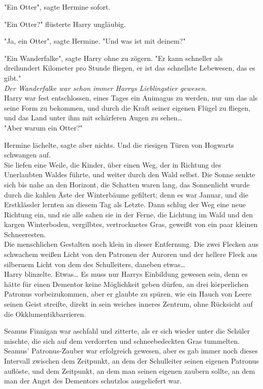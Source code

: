 {"Ein Otter", sagte Hermine sofort.

"Ein Otter?" flüsterte Harry ungläubig.

"Ja, ein Otter", sagte Hermine. "Und was ist mit deinem?"

"Ein Wanderfalke", sagte Harry ohne zu zögern. "Er kann schneller als dreihundert Kilometer pro Stunde fliegen, er ist das schnellste Lebewesen, das es gibt."\\ \emph{Der Wanderfalke war schon immer Harrys Lieblingstier gewesen.}\\ Harry war fest entschlossen, eines Tages ein Animagus zu werden, nur um das als seine Form zu bekommen, und durch die Kraft seiner eigenen Flügel zu fliegen, und das Land unter ihm mit schärferen Augen zu sehen…\\ "Aber warum ein Otter?"

Hermine lächelte, sagte aber nichts. Und die riesigen Türen von Hogwarts schwangen auf.\\ Sie liefen eine Weile, die Kinder, über einen Weg, der in Richtung des Unerlaubten Waldes führte, und weiter durch den Wald selbst. Die Sonne senkte sich bis nahe an den Horizont, die Schatten waren lang, das Sonnenlicht wurde durch die kahlen Äste der Winterbäume gefiltert; denn es war Januar, und die Erstklässler lernten an diesem Tag als Letzte. Dann schlug der Weg eine neue Richtung ein, und sie alle sahen sie in der Ferne, die Lichtung im Wald und den kargen Winterboden, vergilbtes, vertrocknetes Gras, geweißt von ein paar kleinen Schneeresten.\\ Die menschlichen Gestalten noch klein in dieser Entfernung. Die zwei Flecken aus schwachem weißen Licht von den Patronen der Auroren und der hellere Fleck aus silbernem Licht von dem des Schulleiters, daneben etwas…\\ Harry blinzelte. Etwas… Es muss nur Harrys Einbildung gewesen sein, denn es hätte für einen Dementor keine Möglichkeit geben dürfen, an drei körperlichen Patronus vorbeizukommen, aber er glaubte zu spüren, wie ein Hauch von Leere seinen Geist streifte, direkt in sein weiches inneres Zentrum, ohne Rücksicht auf die Okklumentikbarrieren.

Seamus Finnigan war aschfahl und zitterte, als er sich wieder unter die Schüler mischte, die sich auf dem verdorrten und schneebedeckten Gras tummelten. Seamus' Patronus-Zauber war erfolgreich gewesen, aber es gab immer noch dieses Intervall zwischen dem Zeitpunkt, an dem der Schulleiter seinen eigenen Patronus auflöste, und dem Zeitpunkt, an dem man seinen eigenen zaubern sollte, an dem man der Angst des Dementors schutzlos ausgeliefert war.

}
